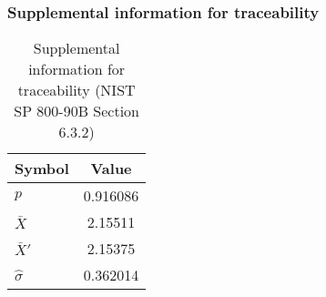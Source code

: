 \documentclass[a3paper,xelatex,english]{bxjsarticle}
\begin{document}
\subsubsection{Supplemental information for traceability}
\renewcommand{\arraystretch}{1.8}
\begin{table}[h]
\caption{Supplemental information for traceability (NIST SP 800-90B Section 6.3.2)}
\begin{center}
\begin{tabular}{|l|c|}
\hline 
\rowcolor{anotherlightblue} %
Symbol				& Value \\ \hline 
$p$				& 0.916086\\ \hline 
$\bar{X}$ 		&  2.15511\\ \hline
$\bar{X}'$		&  2.15375\\ \hline
$\hat{\sigma}$		& 0.362014\\ \hline
\end{tabular}
\end{center}
\end{table}
\renewcommand{\arraystretch}{1.4}
\clearpage
\end{document}
